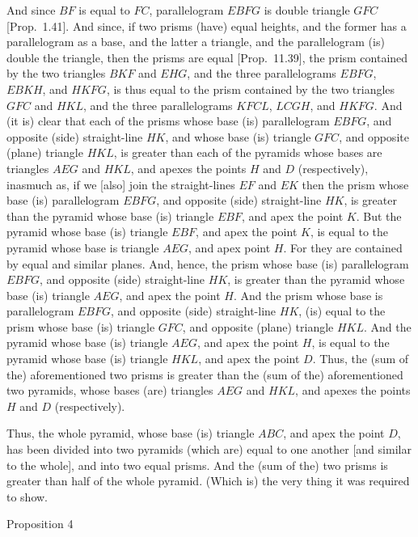 And since $BF$ is equal to $FC$, parallelogram $EBFG$ is double triangle $GFC$ [Prop.~1.41]. And since, if two prisms (have) 
equal heights, and the former has a parallelogram as a base, and the latter a triangle, and the parallelogram (is) double
the triangle, then the prisms are equal [Prop.~11.39],  the prism
contained by the two triangles $BKF$ and $EHG$, and the three parallelograms $EBFG$,
$EBKH$, and $HKFG$, is thus  equal to the prism contained by the two triangles $GFC$ and
$HKL$, and the three parallelograms $KFCL$, $LCGH$, and $HKFG$. And (it is) clear that
each of the prisms whose base (is) parallelogram $EBFG$, and opposite (side) straight-line
$HK$, and whose base (is) triangle $GFC$, and opposite (plane) triangle $HKL$, is greater than
each of the pyramids whose bases are triangles $AEG$ and $HKL$, and apexes the points
$H$ and $D$ (respectively), inasmuch as, if we [also] join the straight-lines
$EF$ and $EK$ then the prism whose base (is) parallelogram $EBFG$, and opposite
(side) straight-line $HK$, is greater than the pyramid whose base (is) triangle $EBF$,
and apex the point $K$. But the pyramid whose base (is) triangle $EBF$, and apex the point $K$,
is equal to the pyramid whose base is triangle $AEG$, and apex point $H$. For
they are contained by equal and similar planes. And, hence, the prism whose base (is)
parallelogram $EBFG$, and opposite (side) straight-line $HK$, is greater than the pyramid
whose base (is) triangle $AEG$, and apex the  point $H$. And the prism 
whose base is
parallelogram $EBFG$, and opposite (side) straight-line $HK$, (is) equal to the prism
whose base (is) triangle $GFC$, and opposite (plane) triangle $HKL$. And the pyramid whose
base (is) triangle $AEG$, and apex the  point $H$, is equal to the pyramid whose base (is) triangle
$HKL$, and apex the point $D$. Thus, the (sum of the) aforementioned
two prisms is greater than the (sum of the) aforementioned two pyramids, whose bases (are)
triangles $AEG$ and $HKL$, and apexes the points $H$ and $D$ (respectively).

Thus, the whole pyramid, whose base (is) triangle $ABC$, and apex the point $D$, has been
divided into two pyramids (which are) equal to one another [and similar to the whole],
and into two equal prisms. And the (sum of the) two prisms is greater than half of the
whole pyramid. (Which is) the very thing it was required to show.


\begin{center}
{\large Proposition 4}
\end{center}


